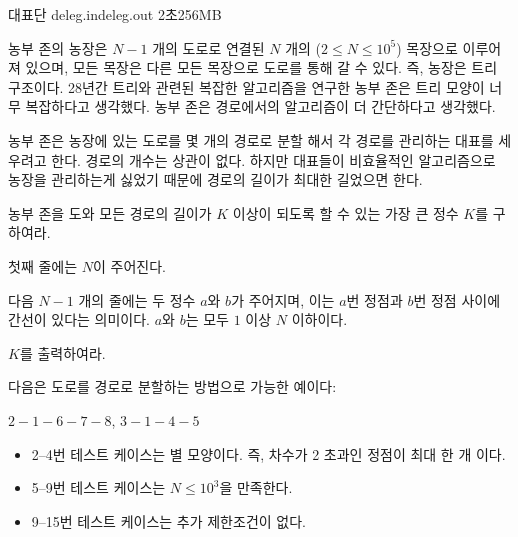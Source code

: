 \begin{problem}{대표단}
	{deleg.in}{deleg.out}
	{2초}{256MB}{}
	
	농부 존의 농장은 $N-1$ 개의 도로로 연결된 $N$ 개의 ($2 \le N \le 10^5$) 목장으로 이루어져 있으며, 모든 목장은 다른 모든 목장으로 도로를 통해 갈 수 있다. 즉, 농장은 트리 구조이다. 28년간 트리와 관련된 복잡한 알고리즘을 연구한 농부 존은 트리 모양이 너무 복잡하다고 생각했다. 농부 존은 경로에서의 알고리즘이 더 간단하다고 생각했다.
	
	농부 존은 농장에 있는 도로를 몇 개의 경로로 분할 해서 각 경로를 관리하는 대표를 세우려고 한다. 경로의 개수는 상관이 없다. 하지만 대표들이 비효율적인 알고리즘으로 농장을 관리하는게 싫었기 때문에 경로의 길이가 최대한 길었으면 한다.
	
	농부 존을 도와 모든 경로의 길이가 $K$ 이상이 되도록 할 수 있는 가장 큰 정수 $K$를 구하여라.
	
	\InputFile
	
	첫째 줄에는 $N$이 주어진다.
	
	다음 $N-1$ 개의 줄에는 두 정수 $a$와 $b$가 주어지며, 이는 $a$번 정점과 $b$번 정점 사이에 간선이 있다는 의미이다. $a$와 $b$는 모두 $1$ 이상 $N$ 이하이다.
	
	
	\OutputFile
	
	$K$를 출력하여라.
	
	\Example
		
	\begin{example}
	\end{example}
	
	다음은 도로를 경로로 분할하는 방법으로 가능한 예이다:
	
	\begin{center}
		$2 - 1 - 6 - 7 - 8$, $3 - 1 - 4 - 5$
	\end{center}
	
	\Scoring
	
	\begin{itemize}
		\item 2--4번 테스트 케이스는 별 모양이다. 즉, 차수가 2 초과인 정점이 최대 한 개 이다.
		\item 5--9번 테스트 케이스는 $N \le 10^3$을 만족한다.
		\item 9--15번 테스트 케이스는 추가 제한조건이 없다.
	\end{itemize}
	
	
	
	
\end{problem}

